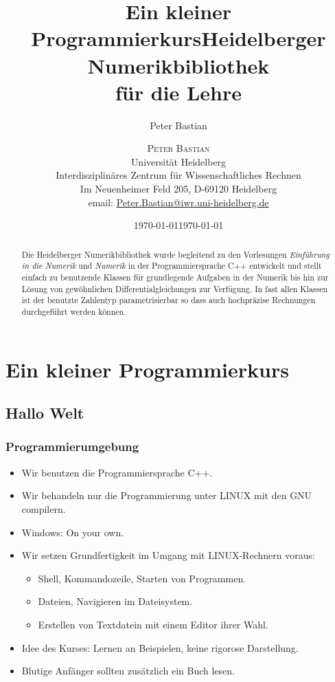 \documentclass[ignorenonframetext,12pt]{beamer}
\title{Ein kleiner Programmierkurs}
\author{Peter Bastian}
\institute[IWR]
  {
    Universität Heidelberg\\
    Interdisziplinäres Zentrum für Wissenschaftliches Rechnen\\
    Im Neuenheimer Feld 205, D-69120 Heidelberg\\
	email: \url{Peter.Bastian@iwr.uni-heidelberg.de}
  }
\date{\today}
\title{Heidelberger Numerikbibliothek \\ für die Lehre}
\author{\textsc{Peter Bastian}\\
    Universität Heidelberg\\
    Interdisziplinäres Zentrum für Wissenschaftliches Rechnen\\
    Im Neuenheimer Feld 205, D-69120 Heidelberg\\
	email: \url{Peter.Bastian@iwr.uni-heidelberg.de}
  }
\date{\today}
\theoremstyle{definition}
\theoremstyle{definition}
\begin{document}
\nocite{*}
{
  \begin{frame}
    \titlepage
  \end{frame}
}
{
\maketitle
}

\begin{abstract}
Die Heidelberger Numerikbibliothek wurde begleitend zu den Vorlesungen
\textit{Einführung in die Numerik} und \textit{Numerik} in der Programmiersprache C++
entwickelt und stellt
einfach zu benutzende Klassen für grundlegende Aufgaben in der Numerik bis hin zur Lösung
von gewöhnlichen Differentialgleichungen zur Verfügung. In fast allen Klassen ist der
benutzte Zahlentyp parametrisierbar so dass auch hochpräzise Rechnungen durchgeführt werden können.
\end{abstract}




\section{Ein kleiner Programmierkurs}

\subsection{Hallo Welt}

\begin{frame}[fragile]
\frametitle{Programmierumgebung}
\begin{itemize}
\item Wir benutzen die Programmiersprache C++.
\item Wir behandeln nur die Programmierung unter LINUX mit den GNU
  compilern.
\item Windows: On your own.
\item Wir setzen Grundfertigkeit im Umgang mit LINUX-Rechnern voraus:
\begin{itemize}
\item Shell, Kommandozeile, Starten von Programmen.
\item Dateien, Navigieren im Dateisystem.
\item Erstellen von Textdatein mit einem Editor ihrer Wahl.
\end{itemize}
\item Idee des Kurses: \glqq{}Lernen an Beispielen\grqq{}, keine
  rigorose Darstellung.
\item Blutige Anfänger sollten zusätzlich ein Buch lesen.
\end{itemize}
\end{frame}
\end{document}
